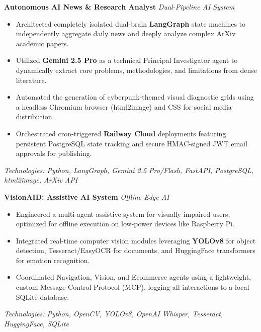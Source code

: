\documentclass[a4paper,10pt]{article}
\begin{document}
\noindent\textbf{Autonomous AI News \& Research Analyst} \hfill \textit{Dual-Pipeline AI System}
\begin{itemize}[leftmargin=*, topsep=4pt, itemsep=2pt]
    \item Architected completely isolated dual-brain \textbf{LangGraph} state machines to independently aggregate daily news and deeply analyze complex ArXiv academic papers.
    \item Utilized \textbf{Gemini 2.5 Pro} as a technical Principal Investigator agent to dynamically extract core problems, methodologies, and limitations from dense literature.
    \item Automated the generation of cyberpunk-themed visual diagnostic grids using a headless Chromium browser (html2image) and CSS for social media distribution.
    \item Orchestrated cron-triggered \textbf{Railway Cloud} deployments featuring persistent PostgreSQL state tracking and secure HMAC-signed JWT email approvals for publishing.
\end{itemize}
\textit{Technologies: Python, LangGraph, Gemini 2.5 Pro/Flash, FastAPI, PostgreSQL, html2image, ArXiv API}
\vspace{8pt}

\noindent\textbf{VisionAID: Assistive AI System} \hfill \textit{Offline Edge AI}
\begin{itemize}[leftmargin=*, topsep=4pt, itemsep=2pt]
    \item Engineered a multi-agent assistive system for visually impaired users, optimized for offline execution on low-power devices like Raspberry Pi.
    \item Integrated real-time computer vision modules leveraging \textbf{YOLOv8} for object detection, Tesseract/EasyOCR for documents, and HuggingFace transformers for emotion recognition.
    \item Coordinated Navigation, Vision, and Ecommerce agents using a lightweight, custom Message Control Protocol (MCP), logging all interactions to a local SQLite database.
\end{itemize}
\textit{Technologies: Python, OpenCV, YOLOv8, OpenAI Whisper, Tesseract, HuggingFace, SQLite}
\vspace{8pt}
\end{document}
